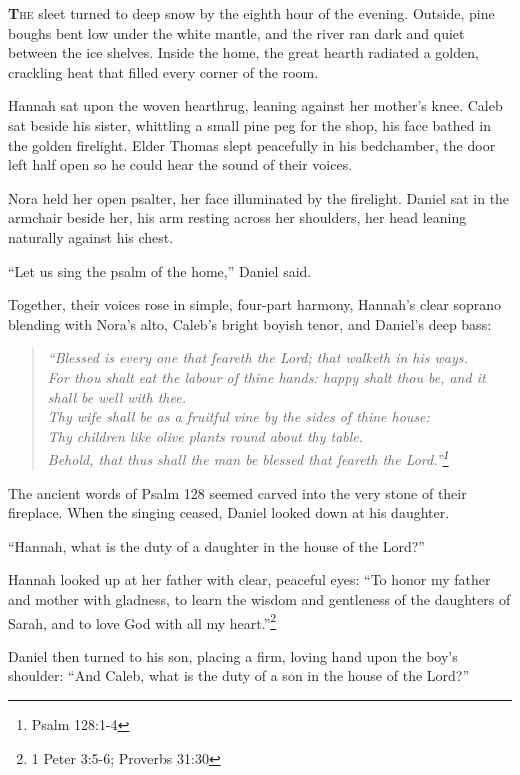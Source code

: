 \documentclass[11pt]{article}
\begin{document}
\lettrine[lines=3,findent=1pt,nindent=0pt]{\textbf{T}}{he} sleet turned to deep snow by the eighth hour of the evening. Outside, pine boughs bent low under the white mantle, and the river ran dark and quiet between the ice shelves. Inside the home, the great hearth radiated a golden, crackling heat that filled every corner of the room.

Hannah sat upon the woven hearthrug, leaning against her mother's knee. Caleb sat beside his sister, whittling a small pine peg for the shop, his face bathed in the golden firelight. Elder Thomas slept peacefully in his bedchamber, the door left half open so he could hear the sound of their voices.

Nora held her open psalter, her face illuminated by the firelight. Daniel sat in the armchair beside her, his arm resting across her shoulders, her head leaning naturally against his chest.

``Let us sing the psalm of the home,'' Daniel said.

Together, their voices rose in simple, four-part harmony, Hannah's clear soprano blending with Nora's alto, Caleb's bright boyish tenor, and Daniel's deep bass:
\begin{quote}
\textit{``Blessed is every one that feareth the Lord; that walketh in his ways.\\
For thou shalt eat the labour of thine hands: happy shalt thou be, and it shall be well with thee.\\
Thy wife shall be as a fruitful vine by the sides of thine house:\\
Thy children like olive plants round about thy table.\\
Behold, that thus shall the man be blessed that feareth the Lord.''\footnote{Psalm 128:1-4}}
\end{quote}
The ancient words of Psalm 128 seemed carved into the very stone of their fireplace. When the singing ceased, Daniel looked down at his daughter.

``Hannah, what is the duty of a daughter in the house of the Lord?''

Hannah looked up at her father with clear, peaceful eyes: ``To honor my father and mother with gladness, to learn the wisdom and gentleness of the daughters of Sarah, and to love God with all my heart.''\footnote{1 Peter 3:5-6; Proverbs 31:30}

Daniel then turned to his son, placing a firm, loving hand upon the boy's shoulder: ``And Caleb, what is the duty of a son in the house of the Lord?''
\end{document}
